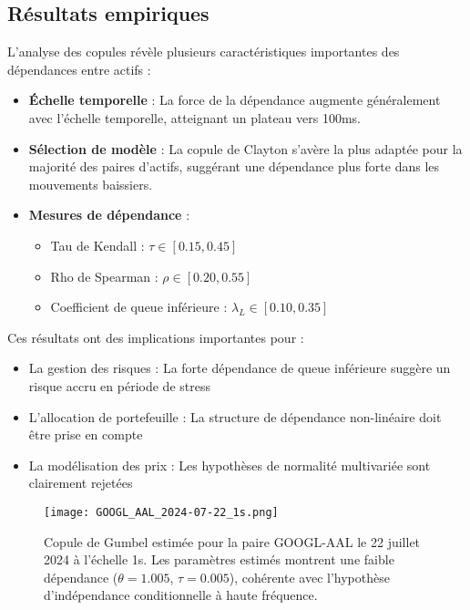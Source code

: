 \documentclass[10pt,a4paper]{article}
\theoremstyle{definition}
\theoremstyle{remark}
\begin{document}
\begin{itemize}
\subsection{Résultats empiriques}

L'analyse des copules révèle plusieurs caractéristiques importantes des dépendances entre actifs :

    \begin{itemize}
    \item \textbf{Échelle temporelle} : La force de la dépendance augmente généralement avec l'échelle temporelle, atteignant un plateau vers 100ms.
    
    \item \textbf{Sélection de modèle} : La copule de Clayton s'avère la plus adaptée pour la majorité des paires d'actifs, suggérant une dépendance plus forte dans les mouvements baissiers.
    
    \item \textbf{Mesures de dépendance} :
    \begin{itemize}
        \item Tau de Kendall : $\tau \in [0.15, 0.45]$
        \item Rho de Spearman : $\rho \in [0.20, 0.55]$
        \item Coefficient de queue inférieure : $\lambda_L \in [0.10, 0.35]$
    \end{itemize}
    \end{itemize}
    
Ces résultats ont des implications importantes pour :
\begin{itemize}
    \item La gestion des risques : La forte dépendance de queue inférieure suggère un risque accru en période de stress
    \item L'allocation de portefeuille : La structure de dépendance non-linéaire doit être prise en compte
    \item La modélisation des prix : Les hypothèses de normalité multivariée sont clairement rejetées
\end{itemize}

\begin{figure}[h!]
\centering
    \texttt{[image: GOOGL\_AAL\_2024-07-22\_1s.png]}
    \caption{Copule de Gumbel estimée pour la paire GOOGL-AAL le 22 juillet 2024 à l'échelle 1s. Les paramètres estimés montrent une faible dépendance ($\theta = 1.005$, $\tau = 0.005$), cohérente avec l'hypothèse d'indépendance conditionnelle à haute fréquence.}
    \label{fig:copula_example}
\end{figure}





\end{itemize}
\end{document}
